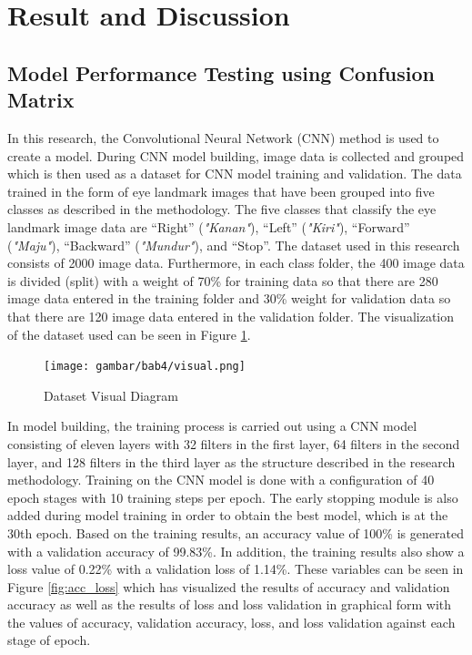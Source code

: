 \section{Result and Discussion}
\label{sec:resultanddiscussion}

\subsection{Model Performance Testing using Confusion Matrix}

In this research, the Convolutional Neural Network (CNN) method is used to create a model. During CNN model building, image data is collected and grouped which is then used as a dataset for CNN model training and validation. The data trained in the form of eye landmark images that have been grouped into five classes as described in the methodology. The five classes that classify the eye landmark image data are “Right” (\emph{"Kanan"}), “Left” (\emph{"Kiri"}), “Forward” (\emph{"Maju"}), “Backward” (\emph{"Mundur"}), and “Stop”. The dataset used in this research consists of 2000 image data. Furthermore, in each class folder, the 400 image data is divided (split) with a weight of 70\% for training data so that there are 280 image data entered in the training folder and 30\% weight for validation data so that there are 120 image data entered in the validation folder. The visualization of the dataset used can be seen in Figure \ref{fig:dataset}.

\begin{figure} [ht] \centering
  \texttt{[image: gambar/bab4/visual.png]}
  \caption{Dataset Visual Diagram}
  \label{fig:dataset}
\end{figure}

In model building, the training process is carried out using a CNN model consisting of eleven layers with 32 filters in the first layer, 64 filters in the second layer, and 128 filters in the third layer as the structure described in the research methodology. Training on the CNN model is done with a configuration of 40 epoch stages with 10 training steps per epoch. The early stopping module is also added during model training in order to obtain the best model, which is at the 30th epoch. Based on the training results, an accuracy value of 100\% is generated with a validation accuracy of 99.83\%. In addition, the training results also show a loss value of 0.22\% with a validation loss of 1.14\%. These variables can be seen in Figure \ref{fig:acc_loss} which has visualized the results of accuracy and validation accuracy as well as the results of loss and loss validation in graphical form with the values of accuracy, validation accuracy, loss, and loss validation against each stage of epoch.

